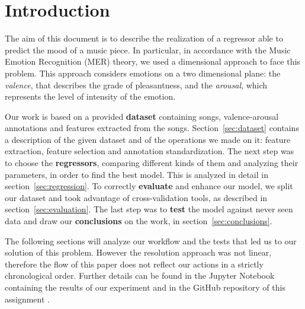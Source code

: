 \section{Introduction}

The aim of this document is to describe the realization of a regressor able to predict the mood of a music piece. In particular, in accordance with the Music Emotion Recognition (MER) theory, we used a dimensional approach to face this problem. This approach considers emotions on a two dimensional plane: the \emph{valence}, that describes the grade of pleasantness, and the \emph{arousal}, which represents the level of intensity of the emotion.

Our work is based on a provided \textbf{dataset} containing songs, valence-arousal annotations and features extracted from the songs. Section~\ref{sec:dataset} contains a description of the given dataset and of the operations we made on it: feature extraction, feature selection and annotation standardization.
The next step was to choose the \textbf{regressors}, comparing different kinds of them and analyzing their parameters, in order to find the best model. This is analyzed in detail in section~\ref{sec:regression}.
To correctly \textbf{evaluate} and enhance our model, we split our dataset and took advantage of cross-validation tools, as described in section~\ref{sec:evaluation}.
The last step was to \textbf{test} the model against never seen data and draw our \textbf{conclusions} on the work, in section~\ref{sec:conclusions}.

The following sections will analyze our workflow and the tests that led us to our solution of this problem. However the resolution approach was not linear, therefore the flow of this paper does not reflect our actions in a strictly chronological order. Further details can be found in the Jupyter Notebook containing the results of our experiment \cite{notebook} and in the GitHub repository of this assignment \cite{github}.

